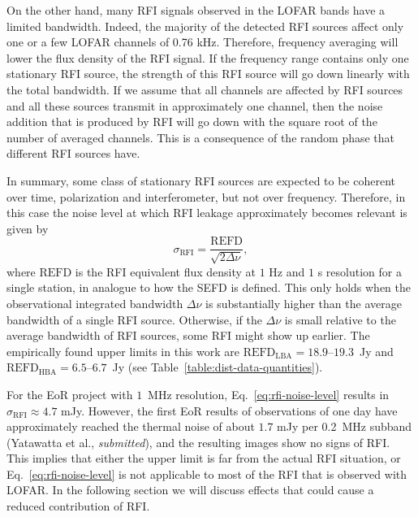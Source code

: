 \documentclass[useAMS,usenatbib]{mn2e}
\begin{document}
On the other hand, many RFI signals observed in the LOFAR bands have a limited bandwidth. Indeed, the majority of the detected RFI sources affect only one or a few LOFAR channels of 0.76 kHz. Therefore, frequency averaging will lower the flux density of the RFI signal. If the frequency range contains only one stationary RFI source, the strength of this RFI source will go down linearly with the total bandwidth. If we assume that all channels are affected by RFI sources and all these sources transmit in approximately one channel, then the noise addition that is produced by RFI will go down with the square root of the number of averaged channels. This is a consequence of the random phase that different RFI sources have.

In summary, some class of stationary RFI sources are expected to be coherent over time, polarization and interferometer, but not over frequency. Therefore, in this case the noise level at which RFI leakage approximately becomes relevant is given by
\begin{equation} \label{eq:rfi-noise-level}
 \sigma_\textrm{RFI} = \frac{\textrm{REFD}}{\sqrt{2 \Delta \nu}},
\end{equation}
where $\textrm{REFD}$ is the RFI equivalent flux density at $1$ Hz and $1$ s resolution for a single station, in analogue to how the SEFD is defined. This only holds when the observational integrated bandwidth $\Delta \nu$ is substantially higher than the average bandwidth of a single RFI source. Otherwise, if the $\Delta \nu$ is small relative to the average bandwidth of RFI sources, some RFI might show up earlier. The empirically found upper limits in this work are $\textrm{REFD}_\textrm{LBA}=18.9$--$19.3$~Jy and $\textrm{REFD}_\textrm{HBA}=6.5$--$6.7$~Jy (see Table~\ref{table:dist-data-quantities}).

For the EoR project with $1$~MHz resolution, Eq.~\ref{eq:rfi-noise-level} results in $\sigma_\textrm{RFI}\approx 4.7$ mJy. However, the first EoR results of observations of one day have approximately reached the thermal noise of about $1.7$ mJy per 0.2~MHz subband (Yatawatta et al., \textit{submitted}), and the resulting images show no signs of RFI. This implies that either the upper limit is far from the actual RFI situation, or Eq.~\ref{eq:rfi-noise-level} is not applicable to most of the RFI that is observed with LOFAR. In the following section we will discuss effects that could cause a reduced contribution of RFI.
\end{document}
